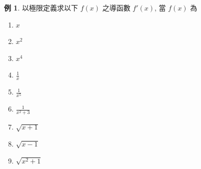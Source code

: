 \documentclass[12pt]{extarticle}
\theoremstyle{definition}
\newtheorem*{ex}{例}
\begin{document}
\begin{ex}
  以極限定義求以下 $f(x)$ 之導函數 $f'(x)$, 當 $f(x)$ 為 
  \setlength{\columnsep}{-10mm}
  \begin{multicols}{9}
    \begin{enumerate}\setlength\itemsep{0em}
      \item $x$ 
      \item $x^2$
      \item $x^4$
      \item $\frac{1}{x}$ 
      \item $\frac{1}{x^5}$
      \item $\frac{1}{x^2 + 3}$
      \item $\sqrt{x + 1}$
      \item $\sqrt{x - 1}$
      \item $\sqrt{x^2 + 1}$
    \end{enumerate}
  \end{multicols}
\end{ex}
\end{document}
